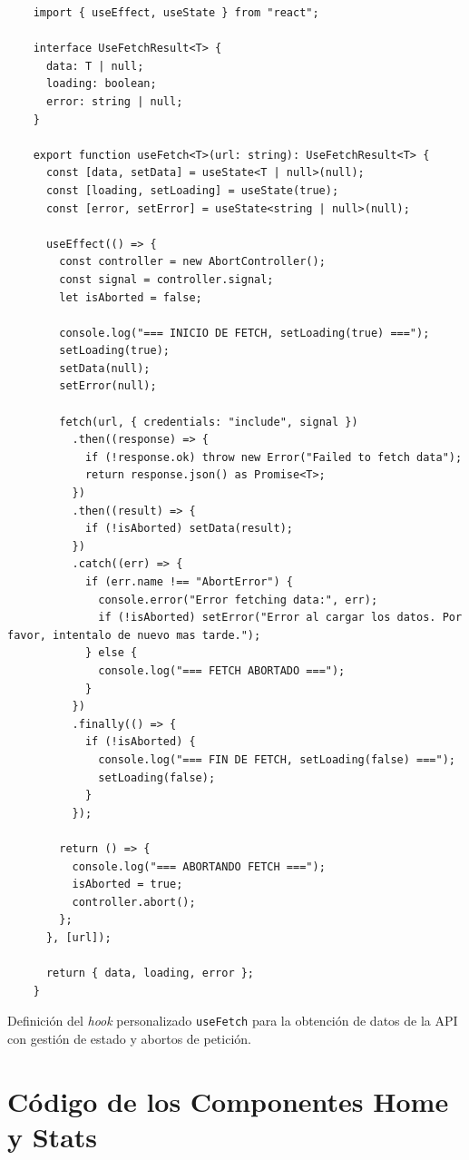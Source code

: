 \begin{ifalgorithm}[H]
    \begin{lstlisting}
    import { useEffect, useState } from "react";

    interface UseFetchResult<T> {
      data: T | null;
      loading: boolean;
      error: string | null;
    }

    export function useFetch<T>(url: string): UseFetchResult<T> {
      const [data, setData] = useState<T | null>(null);
      const [loading, setLoading] = useState(true);
      const [error, setError] = useState<string | null>(null);

      useEffect(() => {
        const controller = new AbortController();
        const signal = controller.signal;
        let isAborted = false;

        console.log("=== INICIO DE FETCH, setLoading(true) ===");
        setLoading(true);
        setData(null);
        setError(null);

        fetch(url, { credentials: "include", signal })
          .then((response) => {
            if (!response.ok) throw new Error("Failed to fetch data");
            return response.json() as Promise<T>;
          })
          .then((result) => {
            if (!isAborted) setData(result);
          })
          .catch((err) => {
            if (err.name !== "AbortError") {
              console.error("Error fetching data:", err);
              if (!isAborted) setError("Error al cargar los datos. Por favor, intentalo de nuevo mas tarde.");
            } else {
              console.log("=== FETCH ABORTADO ===");
            }
          })
          .finally(() => {
            if (!isAborted) {
              console.log("=== FIN DE FETCH, setLoading(false) ===");
              setLoading(false);
            }
          });

        return () => {
          console.log("=== ABORTANDO FETCH ===");
          isAborted = true;
          controller.abort();
        };
      }, [url]);

      return { data, loading, error };
    }
    \end{lstlisting}
    \caption{Definición del \textit{hook} personalizado \texttt{useFetch} para la obtención de datos de la API con gestión de estado y abortos de petición.}
    \label{alg:use_fetch}
\end{ifalgorithm}

\section*{Código de los Componentes Home y Stats}

